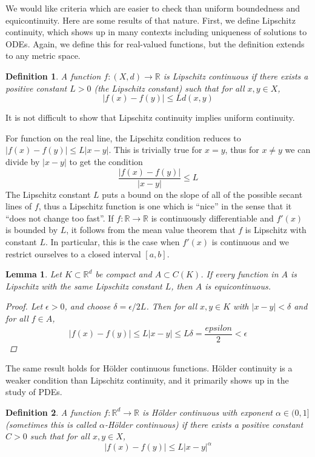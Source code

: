 \documentclass[10pt]{article}         %
\newtheorem{definition}{Definition}[section]
\newtheorem{lemma}{Lemma}[section]
\theoremstyle{remark}
\newcommand{\R}{\mathbb{R}}
\begin{document}
We would like criteria which are easier to check than uniform boundedness and equicontinuity. Here are some results of that nature. First, we define Lipschitz continuity, which shows up in many contexts including uniqueness of solutions to ODEs. Again, we define this for real-valued functions, but the definition extends to any metric space.

\begin{definition}
A function $f: (X, d) \rightarrow \R$ is \emph{Lipschitz continuous} if there exists a positive constant $L > 0$ (the Lipschitz constant) such that for all $x, y \in X$,
\[
|f(x) - f(y)| \leq L d(x, y)
\]
\end{definition}
It is not difficult to show that Lipschitz continuity implies uniform continuity.

For function on the real line, the Lipschitz condition reduces to $|f(x) - f(y)| \leq L|x-y|$. This is trivially true for $x = y$, thus for $x \neq y$ we can divide by $|x - y|$ to get the condition
\[
\frac{|f(x) - f(y)|}{|x-y|} \leq L
\]
The Lipschitz constant $L$ puts a bound on the slope of all of the possible secant lines of $f$, thus a Lipschitz function is one which is ``nice'' in the sense that it ``does not change too fast''. If $f: \R \rightarrow \R$ is continuously differentiable and $f'(x)$ is bounded by $L$, it follows from the mean value theorem that $f$ is Lipschitz with constant $L$. In particular, this is the case when $f'(x)$ is continuous and we restrict ourselves to a closed interval $[a, b]$. 

\begin{lemma}
Let $K \subset \R^d$ be compact and $A \subset C(K)$. If every function in $A$ is Lipschitz with the same Lipschitz constant $L$, then $A$ is equicontinuous.
\begin{proof}
Let $\epsilon > 0$, and choose $\delta = \epsilon/2L$. Then for all $x, y \in K$ with $|x-y| < \delta$ and for all $f \in A$,
\[
|f(x) - f(y)| \leq L|x-y| \leq L\delta = \frac{epsilon}{2} < \epsilon
\]
\end{proof}
\end{lemma}

The same result holds for H\"{o}lder continuous functions. H\"{o}lder continuity is a weaker condition than Lipschitz continuity, and it primarily shows up in the study of PDEs.

\begin{definition}
A function $f: \R^d \rightarrow \R$ is \emph{H\"{o}lder continuous} with exponent $\alpha \in (0, 1]$ (sometimes this is called $\alpha$-H\"{o}lder continuous) if there exists a positive constant $C > 0$ such that for all $x, y \in X$,
\[
|f(x) - f(y)| \leq L |x - y|^\alpha
\]
\end{definition}
\end{document}
